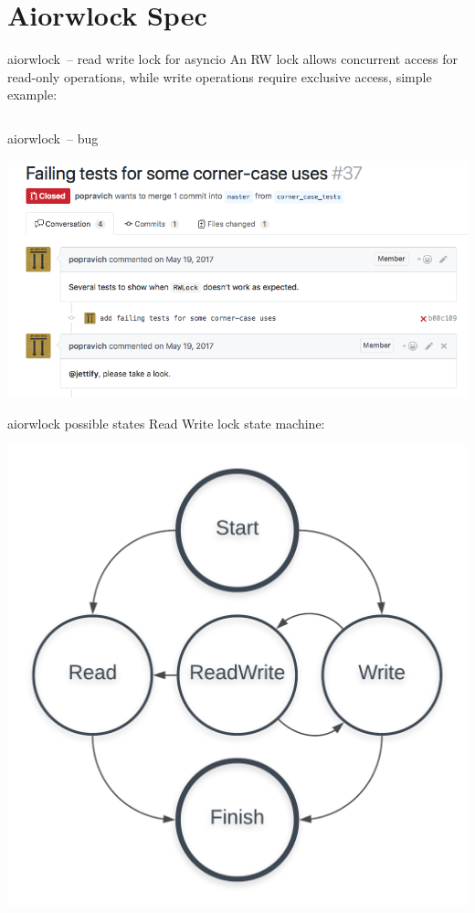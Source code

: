 \documentclass[12pt]{beamer}
\begin{document}
  \section{Aiorwlock Spec}
  \begin{frame}[fragile]{aiorwlock~-- read write lock for asyncio}
      An RW lock allows concurrent access for read-only operations,
      while write operations require exclusive access, simple example:
      \inputminted[linenos,fontsize=\scriptsize]{python}{figures/lock.py}
  \end{frame}
  \begin{frame}{aiorwlock~-- bug}
      \begin{center}
        \includegraphics[scale=0.40]{figures/aiorwlock_bug}
      \end{center}
  \end{frame}
  \begin{frame}{aiorwlock possible states}
      Read Write lock state machine:
      \begin{center}
          \includegraphics[scale=0.15]{figures/task_states2}
      \end{center}
  \end{frame}
\end{document}
